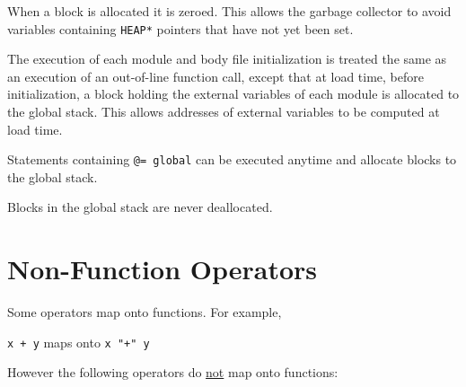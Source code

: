 \documentclass[12pt]{article}
\begin{document}
When a block is allocated it is zeroed.  This
allows the garbage collector to avoid variables containing
{\tt *HEAP*} pointers that have not yet been set.

The execution of each module and body file initialization is
treated the same as an execution of an out-of-line function
call, except that at load time, before initialization,
a block holding the external variables of each module is
allocated to the global stack\label{GLOBAL-MEMORY}.  This allows addresses of
external variables to be computed at load time.

Statements containing {\tt @= global} can be executed anytime
and allocate blocks to the global stack.

Blocks in the global stack are never deallocated.

\section{Non-Function Operators}

Some operators map onto functions.  For example, \\
\centerline{{\tt x + y} maps onto {\tt x "+" y}}

However the following operators do \underline{not} map onto functions:
\end{document}
